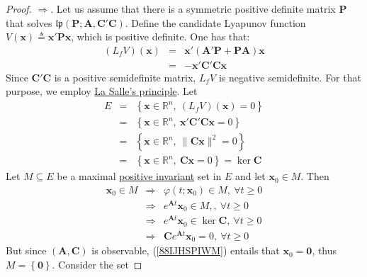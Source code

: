 \documentclass[a4paper,10pt,oneside]{book}
\newtheorem{theorem}{Theorem}
\begin{document}
\begin{proof}
 $\Rightarrow$. Let us assume that there is a symmetric positive definite matrix $\mathbf P$ that
solves $\mathfrak{lp}(\mathbf{P};\mathbf{A},\mathbf{C}'\mathbf{C})$. Define the candidate Lyapunov 
function $V(\mathbf{x})\triangleq \mathbf{x}'\mathbf{Px}$, which is positive definite. One has that:
\begin{eqnarray}
 (L_fV)(\mathbf{x})&=&\mathbf{x}'(\mathbf{A}'\mathbf{P}+\mathbf{PA})\mathbf{x}\\
&=& -\mathbf{x}'\mathbf{C}'\mathbf{Cx}
\end{eqnarray}
Since $\mathbf{C}'\mathbf{C}$ is a positive semidefinite matrix, $L_fV$ is negative
semidefinite. For that purpose, we employ \hyperlink{thm:LaSalle}{La Salle's principle}. Let
\begin{eqnarray}
 E&=&\left\{\mathbf{x}\in\mathbb{R}^n,\ (L_fV)(\mathbf{x})=0\right\}\\
&=&\left\{\mathbf{x}\in\mathbb{R}^n,\ \mathbf{x}'\mathbf{C}'\mathbf{Cx}=0\right\}\\
&=&\left\{\mathbf{x}\in\mathbb{R}^n,\ \|\mathbf{Cx}\|^2=0\right\}\\
&=&\left\{\mathbf{x}\in\mathbb{R}^n,\ \mathbf{Cx}=0\right\}=\operatorname{ker}\mathbf{C}
\end{eqnarray}
Let $M\subseteq E$ be a maximal \hyperlink{def:positiveInvariant}{positive invariant} set in $E$ and let $\mathbf{x}_0\in M$. Then
\begin{eqnarray}
 \mathbf{x}_0\in M &\Rightarrow& \varphi(t;\mathbf{x}_0)\in M,\ \forall t\geq 0\\
&\Rightarrow& e^{\mathbf{A}t}\mathbf{x}_0\in M,,\ \forall t\geq 0\\
&\Rightarrow& e^{\mathbf{A}t}\mathbf{x}_0\in \operatorname{ker}\mathbf{C},\ \forall t\geq 0\\
&\Rightarrow& \mathbf{C}e^{\mathbf{A}t}\mathbf{x}_0=0,\ \forall t\geq 0\label{88IJHSPIWM}
\end{eqnarray}
But since $(\mathbf{A},\mathbf{C})$ is observable, (\ref{88IJHSPIWM}) entails that
$\mathbf{x}_0=\mathbf{0}$, thus $M=\left\{\mathbf{0}\right\}$. Consider the set

\end{proof}
\end{document}
